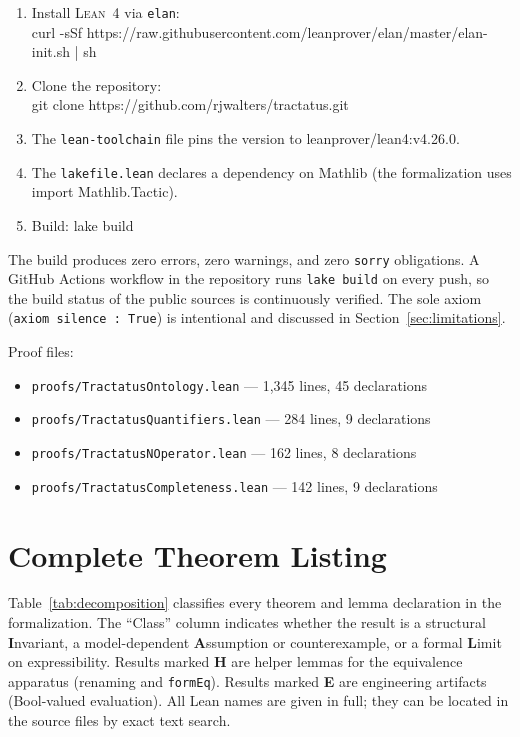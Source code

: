 \documentclass[10pt, letterpaper]{article}
\theoremstyle{definition}
\theoremstyle{remark}
\newcommand{\Lean}{\textsc{Lean}}
\begin{document}
\begin{enumerate}[nosep]
  \item Install \Lean~4 via \texttt{elan}:\\
    {\small\ttfamily curl -sSf https://raw.githubusercontent.com/\allowbreak{}leanprover/\allowbreak{}elan/\allowbreak{}master/\allowbreak{}elan-init.sh | sh}
  \item Clone the repository:\\
    {\small\ttfamily git clone https://github.com/rjwalters/tractatus.git}
  \item The \texttt{lean-toolchain} file pins the version to
    {\small\ttfamily leanprover/lean4:v4.26.0}.
  \item The \texttt{lakefile.lean} declares a dependency on
    Mathlib (the formalization uses
    {\small\ttfamily import Mathlib.Tactic}).
  \item Build: {\small\ttfamily lake build}
\end{enumerate}

\noindent
The build produces zero errors, zero warnings, and zero
\texttt{sorry} obligations.  A GitHub Actions workflow in the
repository runs \texttt{lake build} on every push, so the build
status of the public sources is continuously verified.  The sole axiom
(\texttt{axiom silence : True}) is intentional and
discussed in Section~\ref{sec:limitations}.

Proof files:
\begin{itemize}[nosep]
  \item \texttt{proofs/TractatusOntology.lean} --- 1,345 lines, 45 declarations
  \item \texttt{proofs/TractatusQuantifiers.lean} --- 284 lines, 9 declarations
  \item \texttt{proofs/TractatusNOperator.lean} --- 162 lines, 8 declarations
  \item \texttt{proofs/TractatusCompleteness.lean} --- 142 lines, 9 declarations
\end{itemize}

\section{Complete Theorem Listing}
\label{app:theorems}

Table~\ref{tab:decomposition} classifies every theorem and lemma
declaration in the formalization.  The ``Class'' column indicates
whether the result is a structural \textbf{I}nvariant,
a model-dependent \textbf{A}ssumption or counterexample, or a
formal \textbf{L}imit on expressibility.  Results marked
\textbf{H} are helper lemmas for the equivalence apparatus
(renaming and \texttt{formEq}).
Results marked \textbf{E} are engineering artifacts
(Bool-valued evaluation).  All Lean names are given in full;
they can be located in the source files by exact text search.
\end{document}
